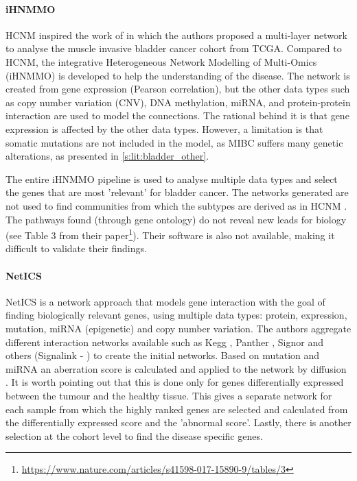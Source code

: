 \paragraph*{iHNMMO} \label{s:lit:iHNMMO}

HCNM inspired the work of \citet{Peng2017-ik} in which the authors proposed a multi-layer network to analyse the muscle invasive bladder cancer cohort from TCGA. Compared to HCNM, the integrative Heterogeneous Network Modelling of Multi-Omics (iHNMMO) is developed to help the understanding of the disease. The network is created from gene expression (Pearson correlation), but the other data types such as copy number variation (CNV), DNA methylation, miRNA, and protein-protein interaction are used to model the connections. The rational behind it is that gene expression is affected by the other data types. However, a limitation is that somatic mutations are not included in the model, as MIBC suffers many genetic alterations, as presented in \cref{s:lit:bladder_other}.

The entire iHNMMO pipeline is used to analyse multiple data types and select the genes that are most 'relevant' for bladder cancer. The networks generated are not used to find communities from which the subtypes are derived as in HCNM \citep{Vangimalla2021-fc, Care2019-ij}. The pathways found (through gene ontology) do not reveal new leads for biology (see Table 3 from their paper\footnote{\url{https://www.nature.com/articles/s41598-017-15890-9/tables/3}}). Their software is also not available, making it difficult to validate their findings.

\paragraph*{NetICS} \label{s:lit:netICS}

NetICS \citep{Dimitrakopoulos2018-br} is a network approach that models gene interaction with the goal of finding biologically relevant genes, using multiple data types: protein, expression, mutation, miRNA (epigenetic) and copy number variation. The authors aggregate different interaction networks available such as Kegg \citep{Kanehisa2017-wj}, Panther \citep{Thomas2022-kn}, Signor \citep{Perfetto2016-tw} and others (Signalink - \cite{Fazekas2013-qh, Wu2010-ap}) to create the initial networks. Based on mutation and miRNA an aberration score is calculated and applied to the network by diffusion \citep{Leiserson2015-kv}. It is worth pointing out that this is done only for genes differentially expressed between the tumour and the healthy tissue. This gives a separate network for each sample from which the highly ranked genes are selected and calculated from the differentially expressed score and the 'abnormal score'. Lastly, there is another selection at the cohort level to find the disease specific genes.

